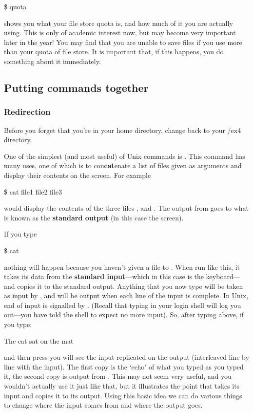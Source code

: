 \begin{ttoutenv}
\$  quota\return
\end{ttoutenv}

shows you what your file store quota is, and how much of it you are
actually using. This is only of academic interest now, but may become
very important later in the year! You may find that you are unable to
save files if you use more than your quota of
file store. It is important that, if this happens, you do something
about it immediately.
 
\subsection{Putting commands together} 
\subsubsection{Redirection}  
Before you forget that you're in your home directory, change back to
your \crsname/ex4 directory.

One of the simplest (and most useful) of Unix commands is
. This command has many uses, one of which is to
con\textbf{cat}enate a list of files given as arguments and display
their contents on the screen. For example
\begin{ttoutenv}
\$  cat file1 file2 file3 \return
\end{ttoutenv}
would display the contents of the three files ,
 and .
The output from  goes to what is known as the
\textbf{standard output} (in this case the screen).

If you type  
\begin{ttoutenv}
\$  cat \return
\end{ttoutenv}
nothing will happen because you haven't given a file to .
When run like this, it takes its data from the \textbf{standard input}---which in this case is the keyboard---and copies it to the standard
output. Anything that you now type will be taken as input by
, and will be output when each line of the input is
complete. In Unix, end of input is signalled by .
(Recall that typing  in your login shell will log you
out---you have told the shell to expect no more input). So, after
typing  above, if you type:
\begin{ttoutenv}
The cat
sat
on the
mat
\end{ttoutenv}


and then press  you will see the input replicated on the output (interleaved line by line with the input). The first copy is the `echo' of what you typed as
you typed it, the second copy is output from . This may
not seem very useful, and you wouldn't actually use it just like that,
but it illustrates the point that  takes its input and copies it
to its output. Using this basic idea we can do various things to
change where the input comes from and where the output goes.

